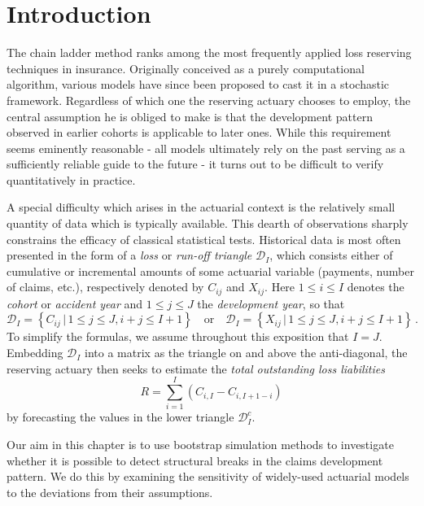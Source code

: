 \documentclass[a4paper]{book}
\theoremstyle{plain}
\begin{document}
\section{Introduction}

The chain ladder method ranks among the most frequently applied loss reserving techniques in insurance. Originally conceived as a purely computational algorithm, various models have since been proposed to cast it in a stochastic framework. Regardless of which one the reserving actuary chooses to employ, the central assumption he is obliged to make is that the development pattern observed in earlier cohorts is applicable to later ones. While this requirement seems eminently reasonable - all models ultimately rely on the past serving as a sufficiently reliable guide to the future - it turns out to be difficult to verify quantitatively in practice. 

A special difficulty which arises in the actuarial context is the relatively small quantity of data which is typically available. This dearth of observations sharply constrains the efficacy of classical statistical tests. Historical data is most often presented in the form of a \emph{loss} or \emph{run-off triangle} $\mathcal{D}_I$, which consists either of cumulative or incremental amounts of some actuarial variable (payments, number of claims, etc.), respectively denoted by $C_{ij}$ and $X_{ij}$. Here $1 \leq i \leq I$ denotes the \emph{cohort} or \emph {accident year} and $1 \leq j \leq J$ the \emph{development year}, so that
\begin{equation}
    \mathcal{D}_I = \left\lbrace C_{ij} \, \vert \, 1 \leq j \leq J, i + j \leq I + 1 \right \rbrace 
    \quad \text{or} \quad 
    \mathcal{D}_I = \left\lbrace X_{ij} \, \vert \, 1 \leq j \leq J, i + j \leq I + 1 \right \rbrace \,.
\end{equation}
To simplify the formulas, we assume throughout this exposition that $I = J$. Embedding $\mathcal{D}_I$ into a matrix as the triangle on and above the anti-diagonal, the reserving actuary then seeks to estimate the \emph{total outstanding loss liabilities}
\begin{equation}
    R = \sum_{i = 1}^I (C_{i, I} - C_{i, I + 1- i})
\end{equation}
by forecasting the values in the lower triangle $\mathcal{D}^c_I$. 

Our aim in this chapter is to use bootstrap simulation methods to investigate whether it is possible to detect structural breaks in the claims development pattern. We do this by examining the sensitivity of widely-used actuarial models to the deviations from their assumptions.  
\end{document}
